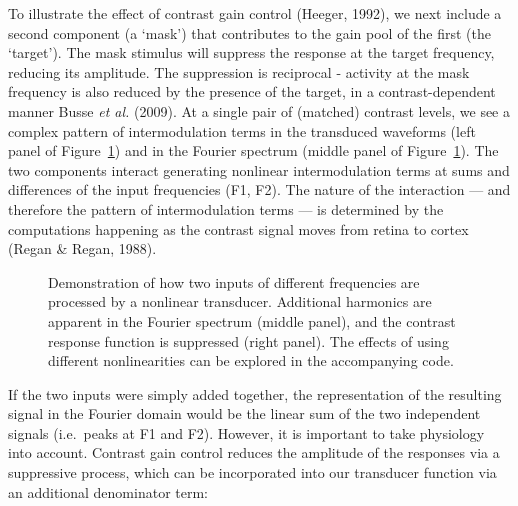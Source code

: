 \documentclass[
  letterpaper,
  DIV=11,
  numbers=noendperiod]{scrartcl}
\begin{document}
To illustrate the effect of contrast gain control (Heeger, 1992), we
next include a second component (a `mask') that contributes to the gain
pool of the first (the `target'). The mask stimulus will suppress the
response at the target frequency, reducing its amplitude. The
suppression is reciprocal - activity at the mask frequency is also
reduced by the presence of the target, in a contrast-dependent manner
Busse \emph{et al.} (2009). At a single pair of (matched) contrast
levels, we see a complex pattern of intermodulation terms in the
transduced waveforms (left panel of Figure~\ref{fig-twoinputs}) and in
the Fourier spectrum (middle panel of Figure~\ref{fig-twoinputs}). The
two components interact generating nonlinear intermodulation terms at
sums and differences of the input frequencies (F1, F2). The nature of
the interaction --- and therefore the pattern of intermodulation terms
--- is determined by the computations happening as the contrast signal
moves from retina to cortex (Regan \& Regan, 1988).

\begin{figure}


\caption{\label{fig-twoinputs}Demonstration of how two inputs of
different frequencies are processed by a nonlinear transducer.
Additional harmonics are apparent in the Fourier spectrum (middle
panel), and the contrast response function is suppressed (right panel).
The effects of using different nonlinearities can be explored in the
accompanying code.}

\end{figure}%

If the two inputs were simply added together, the representation of the
resulting signal in the Fourier domain would be the linear sum of the
two independent signals (i.e.~peaks at F1 and F2). However, it is
important to take physiology into account. Contrast gain control reduces
the amplitude of the responses via a suppressive process, which can be
incorporated into our transducer function via an additional denominator
term:
\end{document}
